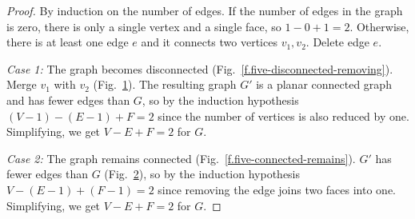 \begin{proof}
By induction on the number of edges. If the number of edges in the graph is zero, there is only a single vertex and a single face, so $1-0+1=2$. Otherwise, there is at least one edge $e$ and it connects two vertices $v_1,v_2$. Delete edge $e$.

\textit{Case 1:}
The graph becomes disconnected (Fig.~\ref{f.five-disconnected-removing}). Merge $v_1$ with $v_2$ (Fig.~\ref{f.five-disconnected-merge}). The resulting graph $G'$ is a planar connected graph and has fewer edges than $G$, so by the induction hypothesis $(V-1)-(E-1)+F=2$ since the number of vertices is also reduced by one. Simplifying, we get $V-E+F=2$ for $G$.
\begin{figure}[ht]
\subfigures
{}
\hfill
{}
\label{f.five-disconnected-removing}
\label{f.five-disconnected-merge}
\end{figure}

\textit{Case 2:}
The graph remains connected (Fig.~\ref{f.five-connected-remains}). $G'$ has fewer edges than $G$ (Fig.~\ref{f.five-connected-fewer}), so by the induction hypothesis $V-(E-1)+(F-1)=2$ since removing the edge joins two faces into one. Simplifying, we get $V-E+F=2$ for $G$.
\end{proof}

\begin{figure}[ht]
\subfigures
{}
\hfill
{}
\label{f.five-connected-remains}
\label{f.five-connected-fewer}
\end{figure}


